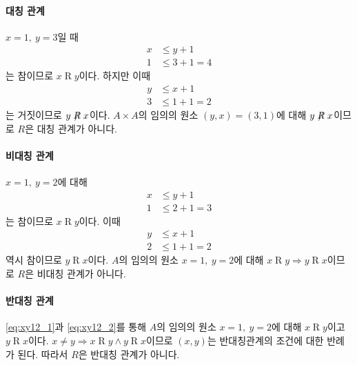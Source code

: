 \documentclass{oblivoir}
\begin{document}
\paragraph{대칭 관계}
$x = 1,\ y = 3$일 때
\begin{equation}\label{eq:xy13_1}
    \begin{aligned}
        x &\leq y + 1 \\
        1 &\leq 3 + 1 = 4
    \end{aligned}
\end{equation}
는 참이므로 $x \mathrel R y$이다.
하지만 이때
\begin{equation}\label{eq:xy13_2}
    \begin{aligned}
        y &\leq x + 1 \\
        3 &\leq 1 + 1 = 2
    \end{aligned}
\end{equation}
는 거짓이므로 $y \not \mathrel R x$이다.
$A \times A$의 임의의 원소 $(y,x) = (3,1)$에 대해 $y \not \mathrel R x$이므로
$R$은 대칭 관계가 아니다.

\paragraph{비대칭 관계}
$x = 1,\ y = 2$에 대해
\begin{equation}\label{eq:xy12_1}
    \begin{aligned}
        x &\leq y + 1 \\
        1 &\leq 2 + 1 = 3
    \end{aligned}
\end{equation}
는 참이므로 $x \mathrel R y$이다.
이때
\begin{equation}\label{eq:xy12_2}
    \begin{aligned}
        y &\leq x + 1 \\
        2 &\leq 1 + 1 = 2
    \end{aligned}
\end{equation}
역시 참이므로 $y \mathrel R x$이다.
$A$의 임의의 원소 $x = 1,\ y = 2$에 대해
$x \mathrel R y \Rightarrow y \mathrel R x$이므로
$R$은 비대칭 관계가 아니다.

\paragraph{반대칭 관계}
\eqref{eq:xy12_1}과 \eqref{eq:xy12_2}를 통해
$A$의 임의의 원소 $x = 1,\ y = 2$에 대해
$x \mathrel R y$이고 $y \mathrel R x$이다.
$x \neq y \Rightarrow x \mathrel R y \wedge y \mathrel R x$이므로
$(x,y)$는 반대칭관계의 조건에 대한 반례가 된다.
따라서 $R$은 반대칭 관계가 아니다.
\end{document}
